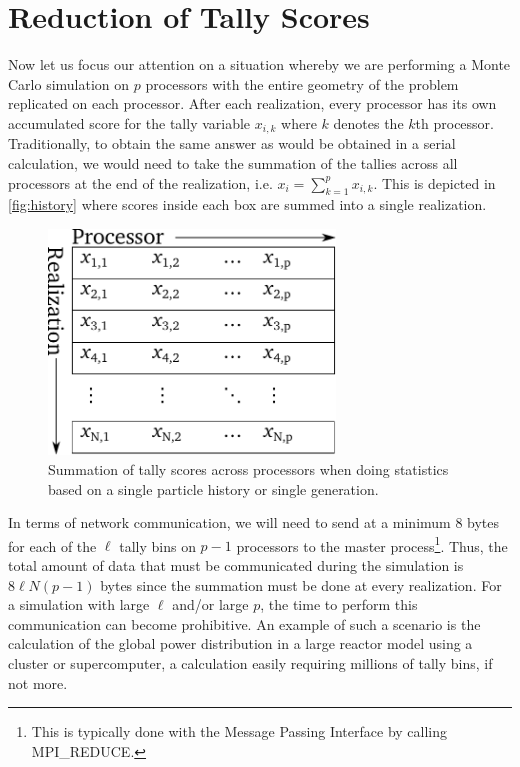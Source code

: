 \section{Reduction of Tally Scores}
\label{sec:tally-reduction}

Now let us focus our attention on a situation whereby we are performing a Monte
Carlo simulation on $p$ processors with the entire geometry of the problem
replicated on each processor. After each realization, every processor has its
own accumulated score for the tally variable $x_{i,k}$ where $k$ denotes the
$k$th processor. Traditionally, to obtain the same answer as would be obtained
in a serial calculation, we would need to take the summation of the tallies
across all processors at the end of the realization, i.e. $x_i = \sum_{k=1}^p
x_{i,k}$. This is depicted in \autoref{fig:history} where scores inside each box
are summed into a single realization.
\begin{figure}[ht]
  \centering
  \includegraphics[width=3in]{figures/ch4/history.pdf}
  \caption{Summation of tally scores across processors when doing statistics
    based on a single particle history or single generation.}
  \label{fig:history}
\end{figure}
In terms of network communication, we will need to send at a minimum 8 bytes for
each of the $\ell$ tally bins on $p-1$ processors to the master
process\footnote{This is typically done with the Message Passing Interface by
  calling MPI\_REDUCE.}. Thus, the total amount of data that must be
communicated during the simulation is $8\ell N (p-1)$ bytes since the summation
must be done at every realization. For a simulation with large $\ell$ and/or
large $p$, the time to perform this communication can become prohibitive. An
example of such a scenario is the calculation of the global power distribution
in a large reactor model using a cluster or supercomputer, a calculation easily
requiring millions of tally bins, if not more.

